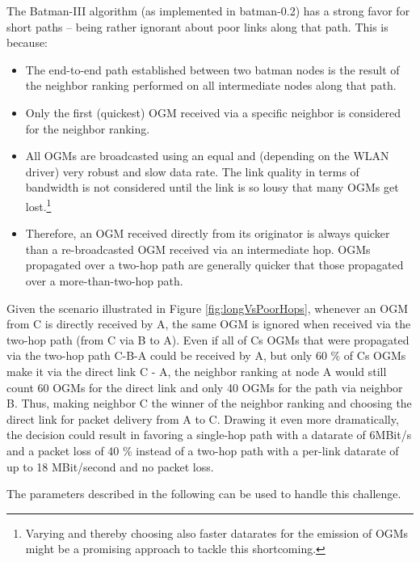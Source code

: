 \documentclass[11pt]{article}
\begin{document}
The Batman-III algorithm (as implemented in batman-0.2) has a strong favor for short paths -- being rather ignorant about poor links along that path. 
%
This is because:
\begin{itemize}

 \item The end-to-end path established between two batman nodes is the result of the neighbor ranking performed on all intermediate nodes along that path.

 \item Only the first (quickest) OGM received via a specific neighbor is considered for the neighbor ranking. %

 \item All OGMs are broadcasted using an equal and (depending on the WLAN driver) very robust and slow data rate. The link quality in terms of bandwidth is not considered until the link is so lousy that many OGMs get lost.\footnote{Varying and thereby choosing also faster datarates for the emission of OGMs might be a promising approach to tackle this shortcoming.}

 \item Therefore, an OGM received directly from its originator is always quicker than a re-broadcasted OGM received via an intermediate hop. OGMs propagated over a two-hop path are generally quicker that those propagated over a more-than-two-hop path.


\end{itemize}
 
%
Given the scenario illustrated in Figure \ref{fig:longVsPoorHops}, 
whenever an OGM from C is directly received by A, the same OGM is ignored when received via the two-hop path (from C via B to A).
%
Even if all of Cs OGMs that were propagated via the two-hop path C-B-A could be received by A,
 but only 60 \% of Cs OGMs make it via the direct link C - A, the neighbor ranking at node A would still count 60 OGMs for the direct link and only 40 OGMs for the path via neighbor B. Thus, making neighbor C the winner of the neighbor ranking and choosing the direct link for packet delivery from A to C. 
%
Drawing it even more dramatically, the decision could result in favoring a single-hop path with a datarate of 6MBit/s and a packet loss of 40 \% instead of a two-hop path with a per-link datarate of up to 18 MBit/second and no packet loss.



The parameters described in the following can be used to handle this challenge.
\end{document}
